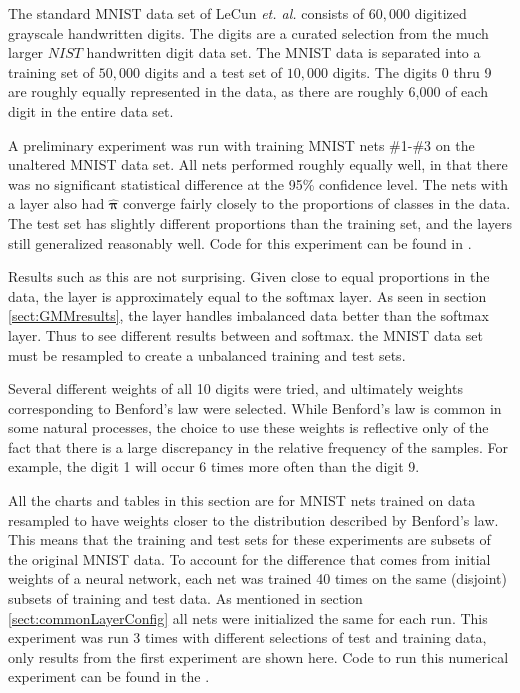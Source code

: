 \label{sect:MNISTresults}
The standard MNIST data set of LeCun \textit{et. al.} \cite{lecun1998gradient} consists of \( 60,000 \) digitized grayscale handwritten digits. The digits are a curated selection from the much larger \( NIST \) handwritten digit data set.  The MNIST data is separated into a training set of \( 50,000 \) digits and a test set of \( 10,000 \) digits.  The digits 0 thru 9 are roughly equally represented in the data, as there are roughly 6,000 of each digit in the entire data set.

A preliminary experiment was run with training MNIST nets \#1-\#3 on the unaltered MNIST data set.  All nets performed roughly equally well, in that there was no significant statistical difference at the 95\% confidence level. The nets with a \RS layer also had \( \hat{\bm \pi} \) converge fairly closely to the proportions of classes in the data.  The test set has slightly different proportions than the training set, and the \RS layers still generalized reasonably well. Code for this experiment can be found in . 

Results such as this are not surprising. Given close to equal proportions in the data, the \RS layer is approximately equal to the softmax layer. As seen in section \ref{sect:GMMresults}, the \RS layer handles imbalanced data better than the softmax layer. Thus to see different results between \RS and softmax. the MNIST data set must be resampled to create a unbalanced training and test sets.

Several different weights of all 10 digits were tried, and ultimately weights corresponding to Benford's law \cite{benford1938} were selected. While Benford's law is common in some natural processes, the choice to use these weights is reflective only of the fact that there is a large discrepancy in the relative frequency of the samples.  For example, the digit 1 will occur 6 times more often than the digit 9.

All the charts and tables in this section are for MNIST nets trained on data resampled to have weights closer to the distribution described by Benford's law.  This means that the training and test sets for these experiments are subsets of the original MNIST data.  To account for the difference that comes from initial weights of a neural network, each net was trained 40 times on the same (disjoint) subsets of training and test data. As mentioned in section \ref{sect:commonLayerConfig} all nets were initialized the same for each run. This experiment was run 3 times with different selections of test and training data, only results from the first experiment are shown here.  Code to run this numerical experiment can be found in the .

